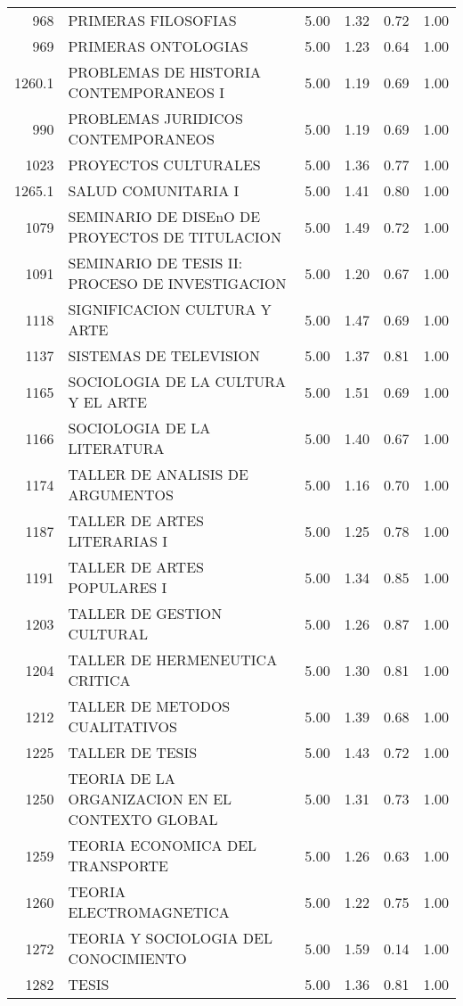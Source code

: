 \begin{table}[ht]
\begin{tabular}{rlrrrr}
  968 & PRIMERAS FILOSOFIAS & 5.00 & 1.32 & 0.72 & 1.00 \\ 
  969 & PRIMERAS ONTOLOGIAS & 5.00 & 1.23 & 0.64 & 1.00 \\ 
  1260.1 & PROBLEMAS DE HISTORIA CONTEMPORANEOS I & 5.00 & 1.19 & 0.69 & 1.00 \\ 
  990 & PROBLEMAS JURIDICOS CONTEMPORANEOS & 5.00 & 1.19 & 0.69 & 1.00 \\ 
  1023 & PROYECTOS CULTURALES & 5.00 & 1.36 & 0.77 & 1.00 \\ 
  1265.1 & SALUD COMUNITARIA I & 5.00 & 1.41 & 0.80 & 1.00 \\ 
  1079 & SEMINARIO DE DISEnO DE PROYECTOS DE TITULACION & 5.00 & 1.49 & 0.72 & 1.00 \\ 
  1091 & SEMINARIO DE TESIS II: PROCESO DE INVESTIGACION & 5.00 & 1.20 & 0.67 & 1.00 \\ 
  1118 & SIGNIFICACION CULTURA Y ARTE & 5.00 & 1.47 & 0.69 & 1.00 \\ 
  1137 & SISTEMAS DE TELEVISION & 5.00 & 1.37 & 0.81 & 1.00 \\ 
  1165 & SOCIOLOGIA DE LA CULTURA Y EL ARTE & 5.00 & 1.51 & 0.69 & 1.00 \\ 
  1166 & SOCIOLOGIA DE LA LITERATURA & 5.00 & 1.40 & 0.67 & 1.00 \\ 
  1174 & TALLER DE ANALISIS DE ARGUMENTOS & 5.00 & 1.16 & 0.70 & 1.00 \\ 
  1187 & TALLER DE ARTES LITERARIAS I & 5.00 & 1.25 & 0.78 & 1.00 \\ 
  1191 & TALLER DE ARTES POPULARES I & 5.00 & 1.34 & 0.85 & 1.00 \\ 
  1203 & TALLER DE GESTION CULTURAL & 5.00 & 1.26 & 0.87 & 1.00 \\ 
  1204 & TALLER DE HERMENEUTICA CRITICA & 5.00 & 1.30 & 0.81 & 1.00 \\ 
  1212 & TALLER DE METODOS CUALITATIVOS & 5.00 & 1.39 & 0.68 & 1.00 \\ 
  1225 & TALLER DE TESIS & 5.00 & 1.43 & 0.72 & 1.00 \\ 
  1250 & TEORIA DE LA ORGANIZACION EN EL CONTEXTO GLOBAL & 5.00 & 1.31 & 0.73 & 1.00 \\ 
  1259 & TEORIA ECONOMICA DEL TRANSPORTE & 5.00 & 1.26 & 0.63 & 1.00 \\ 
  1260 & TEORIA ELECTROMAGNETICA & 5.00 & 1.22 & 0.75 & 1.00 \\ 
  1272 & TEORIA Y SOCIOLOGIA DEL CONOCIMIENTO & 5.00 & 1.59 & 0.14 & 1.00 \\ 
  1282 & TESIS & 5.00 & 1.36 & 0.81 & 1.00 \\ 

\end{tabular}
\end{table}
